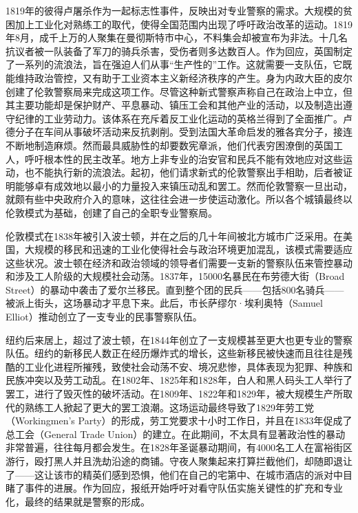 \documentclass[fontset=fandol, a4paper, 12pt, openright]{ctexbook}
\begin{document}
1819年的彼得卢屠杀作为一起标志性事件，反映出对专业警察的需求。大规模的贫困加上工业化对熟练工的取代，使得全国范围内出现了呼吁政治改革的运动。1819年8月，成千上万的人聚集在曼彻斯特市中心，不料集会却被宣布为非法。十几名抗议者被一队装备了军刀的骑兵杀害，受伤者则多达数百人。作为回应，英国制定了一系列的流浪法，旨在强迫人们从事“生产性的”工作。这就需要一支队伍，它既能维持政治管控，又有助于工业资本主义新经济秩序的产生。身为内政大臣的皮尔创建了伦敦警察局来完成这项工作。尽管这种新式警察声称自己在政治上中立，但其主要功能却是保护财产、平息暴动、镇压工会和其他产业的活动，以及制造出遵守纪律的工业劳动力。该体系在充斥着反工业化运动的英格兰得到了全面推广。卢德分子在车间从事破坏活动来反抗剥削。受到法国大革命启发的雅各宾分子，接连不断地制造麻烦。然而最具威胁性的却要数宪章派，他们代表穷困潦倒的英国工人，呼吁根本性的民主改革。地方上非专业的治安官和民兵不能有效地应对这些运动，也不能执行新的流浪法。起初，他们请求新式的伦敦警察出手相助，后者被证明能够卓有成效地以最小的力量投入来镇压动乱和罢工。然而伦敦警察一旦出动，就颇有些中央政府介入的意味，这往往会进一步使运动激化。所以各个城镇最终以伦敦模式为基础，创建了自己的全职专业警察局。

伦敦模式在1838年被引入波士顿，并在之后的几十年间被北方城市广泛采用。在美国，大规模的移民和迅速的工业化使得社会与政治环境更加混乱，该模式需要适应这些状况。波士顿在经济和政治领域的领导者们需要一支新的警察队伍来管控暴动和涉及工人阶级的大规模社会动荡。1837年，15000名暴民在布劳德大街（Broad Street）的暴动中袭击了爱尔兰移民。直到整个团的民兵——包括800名骑兵——被派上街头，这场暴动才平息下来。此后，市长萨缪尔·埃利奥特（Samuel Elliot）推动创立了一支专业的民事警察队伍。

纽约后来居上，超过了波士顿，在1844年创立了一支规模甚至更大也更专业的警察队伍。纽约的新移民人数正在经历爆炸式的增长，这些新移民被快速而且往往是残酷的工业化进程所摧残，致使社会动荡不安、境况悲惨，具体表现为犯罪、种族和民族冲突以及劳工动乱。在1802年、1825年和1828年，白人和黑人码头工人举行了罢工，进行了毁灭性的破坏活动。在1809年、1822年和1829年，被大规模生产所取代的熟练工人掀起了更大的罢工浪潮。这场运动最终导致了1829年劳工党（Workingmen's Party）的形成，劳工党要求十小时工作日，并且在1833年促成了总工会（General Trade Union）的建立。在此期间，不太具有显著政治性的暴动非常普遍，往往每月都会发生。在1828年圣诞暴动期间，有4000名工人在富裕街区游行，殴打黑人并且洗劫沿途的商铺。守夜人聚集起来打算拦截他们，却随即退让了——这让该市的精英们感到恐惧，他们在自己的宅第中、在城市酒店的派对中目睹了事件的进展。作为回应，报纸开始呼吁对看守队伍实施关键性的扩充和专业化，最终的结果就是警察的形成。
\end{document}
